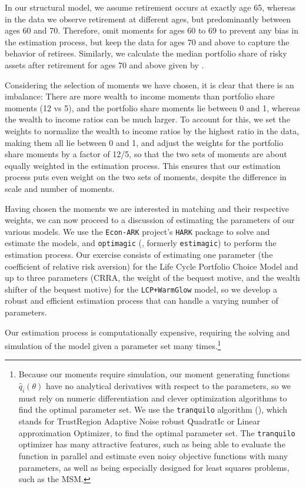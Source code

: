 \documentclass{article}
\begin{document}
In our structural model, we assume retirement occurs at exactly age 65, whereas in the data we observe retirement at different ages, but predominantly between ages 60 and 70.
Therefore, omit moments for ages 60 to 69 to prevent any bias in the estimation process, but keep the data for ages 70 and above to capture the behavior of retirees.
Similarly, we calculate the median portfolio share of risky assets after retirement for ages 70 and above given by \cite{Aboagye2024}.

Considering the selection of moments we have chosen, it is clear that there is an imbalance:
There are more wealth to income moments than portfolio share moments (12 vs 5), and the portfolio share moments lie between 0 and 1, whereas the wealth to income ratios can be much larger.
To account for this, we set the weights to normalize the wealth to income ratios by the highest ratio in the data, making them all lie between 0 and 1, and adjust the weights for the portfolio share moments by a factor of 12/5, so that the two sets of moments are about equally weighted in the estimation process.
This ensures that our estimation process puts even weight on the two sets of moments, despite the difference in scale and number of moments.

Having chosen the moments we are interested in matching and their respective weights, we can now proceed to a discussion of estimating the parameters of our various models.
We use the \texttt{Econ-ARK} project's \texttt{HARK} package to solve and estimate the models, and \texttt{optimagic} (\cite{Gabler2022}, formerly \texttt{estimagic}) to perform the estimation process.
Our exercise consists of estimating one parameter (the coefficient of relative risk aversion) for the Life Cycle Portfolio Choice Model and up to three parameters (CRRA, the weight of the bequest motive, and the wealth shifter of the bequest motive) for the \texttt{LCP+WarmGlow} model, so we develop a robust and efficient estimation process that can handle a varying number of parameters. 

Our estimation process is computationally expensive, requiring the solving and simulation of the model given a parameter set many times.\footnote{Because our moments require simulation, our moment generating functions $\hat{q}_i(\theta)$ have no analytical derivatives with respect to the parameters, so we must rely on numeric differentiation and clever optimization algorithms to find the optimal parameter set.
We use the \texttt{tranquilo} algorithm (\cite{Gabler2024}), which stands for TrustRegion Adaptive Noise robust QuadratIc or Linear approximation Optimizer, to find the optimal parameter set.
The \texttt{tranquilo} optimizer has many attractive features, such as being able to evaluate the function in parallel and estimate even noisy objective functions with many parameters, as well as being especially designed for least squares problems, such as the MSM.}
\end{document}
